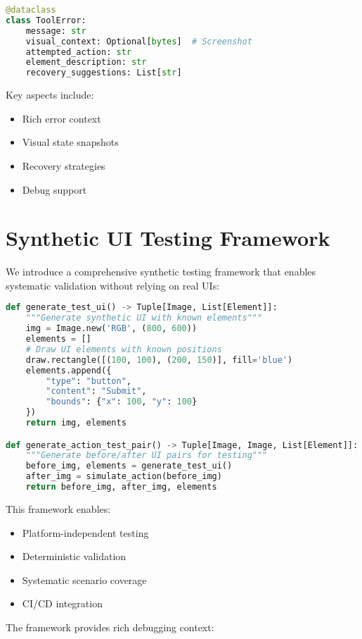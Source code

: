 \documentclass{article}
\begin{document}
\begin{lstlisting}[language=Python]
@dataclass
class ToolError:
    message: str
    visual_context: Optional[bytes]  # Screenshot
    attempted_action: str
    element_description: str
    recovery_suggestions: List[str]
\end{lstlisting}

Key aspects include:
\begin{itemize}
    \item Rich error context
    \item Visual state snapshots
    \item Recovery strategies
    \item Debug support
\end{itemize}

\section{Synthetic UI Testing Framework}
We introduce a comprehensive synthetic testing framework that enables systematic validation without relying on real UIs:

\begin{lstlisting}[language=Python]
def generate_test_ui() -> Tuple[Image, List[Element]]:
    """Generate synthetic UI with known elements"""
    img = Image.new('RGB', (800, 600))
    elements = []
    # Draw UI elements with known positions
    draw.rectangle([(100, 100), (200, 150)], fill='blue')
    elements.append({
        "type": "button",
        "content": "Submit",
        "bounds": {"x": 100, "y": 100}
    })
    return img, elements

def generate_action_test_pair() -> Tuple[Image, Image, List[Element]]:
    """Generate before/after UI pairs for testing"""
    before_img, elements = generate_test_ui()
    after_img = simulate_action(before_img)
    return before_img, after_img, elements
\end{lstlisting}

This framework enables:
\begin{itemize}
    \item Platform-independent testing
    \item Deterministic validation
    \item Systematic scenario coverage
    \item CI/CD integration
\end{itemize}

The framework provides rich debugging context:
\end{document}

